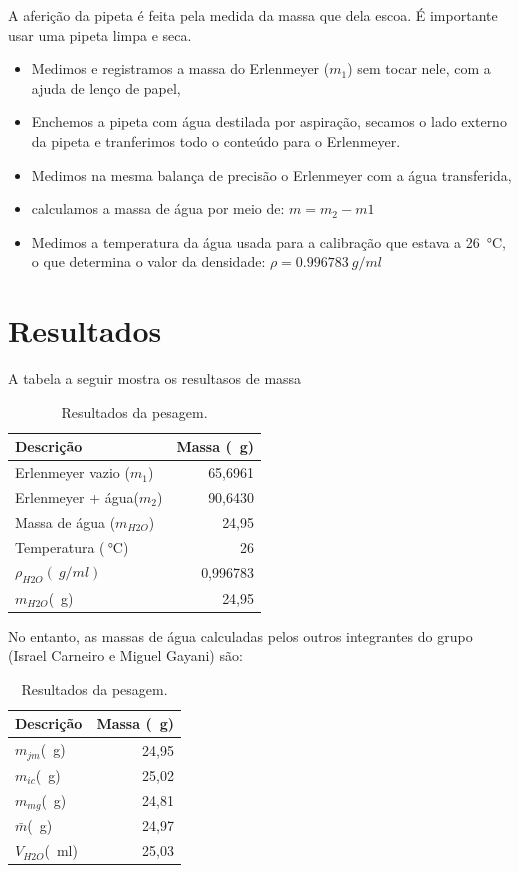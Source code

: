 \documentclass[a4paper,12pt]{article}
\begin{document}
A aferição da pipeta é feita pela medida da massa que dela escoa. É importante usar uma pipeta limpa e seca. 

\begin{itemize}
    \item Medimos e registramos a massa do Erlenmeyer ($m_1$) sem tocar nele, com a ajuda de lenço de papel,
    \item Enchemos a pipeta com água destilada por aspiração, secamos o lado externo da pipeta e tranferimos todo o conteúdo para o Erlenmeyer.
    \item Medimos na mesma balança de precisão o Erlenmeyer com a água transferida,
    \item calculamos a massa de água por meio de: $m=m_2-m1$
    \item Medimos a temperatura da água usada para a calibração que estava a \SI{26}{\degreeCelsius}, o que determina o valor da densidade: $\rho=\SI{0,996783}{g/ml}$
\end{itemize}

\section{Resultados}


A tabela a seguir mostra os resultasos de massa
\begin{table}[H]
\centering
\caption{Resultados da pesagem.}
\label{tab:result}
\begin{tabular}{lr}
\toprule
\textbf{Descrição} &\textbf{Massa (\SI{}{g})} \\
\midrule
Erlenmeyer vazio ($m_1$) & 65,6961\\
Erlenmeyer + água($m_2$)& 90,6430\\
Massa de água ($m_{H2O}$) & 24,95\\
Temperatura ($\SI{}{\degreeCelsius}$) & 26\\
$\rho_{H2O}(\SI{}{g/ml})$ &0,996783\\
$m_{H2O}$(\SI{}{g})&24,95\\

\bottomrule
\end{tabular}
\end{table}

No entanto, as massas de água calculadas pelos outros integrantes do grupo (Israel Carneiro e Miguel Gayani) são:

\begin{table}[H]
\centering
\caption{Resultados da pesagem.}
\label{tab:resfin}
\begin{tabular}{lr}
\toprule
\textbf{Descrição} &\textbf{Massa (\SI{}{g})} \\
\midrule
$m_{jm}$(\SI{}{g})&24,95\\
$m_{ic}$(\SI{}{g})&25,02\\
$m_{mg}$(\SI{}{g})&24,81\\
$\bar{m}$(\SI{}{g})&24,97\\
$V_{H2O}$(\SI{}{ml})&25,03\\
\bottomrule
\end{tabular}
\end{table}
\end{document}
